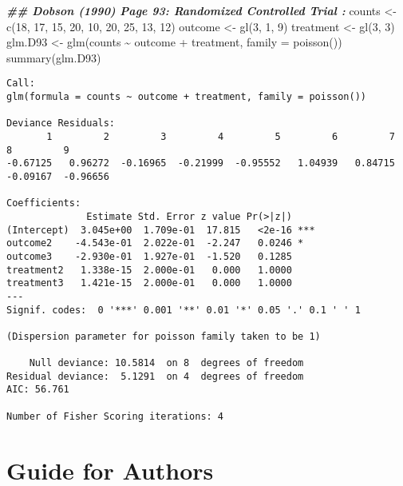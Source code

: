 \documentclass[letterpaper,inpress]{jdsart}
\newenvironment{Shaded}{\begin{snugshade}}{\end{snugshade}}
\newcommand{\AttributeTok}[1]{\textcolor[rgb]{0.77,0.63,0.00}{#1}}
\newcommand{\DecValTok}[1]{\textcolor[rgb]{0.00,0.00,0.81}{#1}}
\newcommand{\DocumentationTok}[1]{\textcolor[rgb]{0.56,0.35,0.01}{\textbf{\textit{#1}}}}
\newcommand{\FunctionTok}[1]{\textcolor[rgb]{0.00,0.00,0.00}{#1}}
\newcommand{\NormalTok}[1]{#1}
\newcommand{\OtherTok}[1]{\textcolor[rgb]{0.56,0.35,0.01}{#1}}
\newcommand{\SpecialCharTok}[1]{\textcolor[rgb]{0.00,0.00,0.00}{#1}}
\begin{document}
\begin{Shaded}
\begin{Highlighting}[]
\DocumentationTok{\#\# Dobson (1990) Page 93: Randomized Controlled Trial :}
\NormalTok{counts }\OtherTok{\textless{}{-}} \FunctionTok{c}\NormalTok{(}\DecValTok{18}\NormalTok{, }\DecValTok{17}\NormalTok{, }\DecValTok{15}\NormalTok{, }\DecValTok{20}\NormalTok{, }\DecValTok{10}\NormalTok{, }\DecValTok{20}\NormalTok{, }\DecValTok{25}\NormalTok{, }\DecValTok{13}\NormalTok{, }\DecValTok{12}\NormalTok{)}
\NormalTok{outcome }\OtherTok{\textless{}{-}} \FunctionTok{gl}\NormalTok{(}\DecValTok{3}\NormalTok{, }\DecValTok{1}\NormalTok{, }\DecValTok{9}\NormalTok{)}
\NormalTok{treatment }\OtherTok{\textless{}{-}} \FunctionTok{gl}\NormalTok{(}\DecValTok{3}\NormalTok{, }\DecValTok{3}\NormalTok{)}
\NormalTok{glm.D93 }\OtherTok{\textless{}{-}} \FunctionTok{glm}\NormalTok{(counts }\SpecialCharTok{\textasciitilde{}}\NormalTok{ outcome }\SpecialCharTok{+}\NormalTok{ treatment, }\AttributeTok{family =} \FunctionTok{poisson}\NormalTok{())}
\FunctionTok{summary}\NormalTok{(glm.D93)}
\end{Highlighting}
\end{Shaded}

\begin{verbatim}
Call:
glm(formula = counts ~ outcome + treatment, family = poisson())

Deviance Residuals: 
       1         2         3         4         5         6         7         8         9  
-0.67125   0.96272  -0.16965  -0.21999  -0.95552   1.04939   0.84715  -0.09167  -0.96656  

Coefficients:
              Estimate Std. Error z value Pr(>|z|)    
(Intercept)  3.045e+00  1.709e-01  17.815   <2e-16 ***
outcome2    -4.543e-01  2.022e-01  -2.247   0.0246 *  
outcome3    -2.930e-01  1.927e-01  -1.520   0.1285    
treatment2   1.338e-15  2.000e-01   0.000   1.0000    
treatment3   1.421e-15  2.000e-01   0.000   1.0000    
---
Signif. codes:  0 '***' 0.001 '**' 0.01 '*' 0.05 '.' 0.1 ' ' 1

(Dispersion parameter for poisson family taken to be 1)

    Null deviance: 10.5814  on 8  degrees of freedom
Residual deviance:  5.1291  on 4  degrees of freedom
AIC: 56.761

Number of Fisher Scoring iterations: 4
\end{verbatim}

\hypertarget{guide-for-authors}{%
\section{Guide for Authors}\label{guide-for-authors}}
\end{document}
